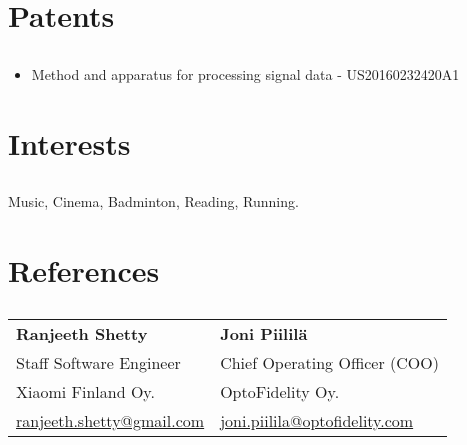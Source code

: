 \documentclass{article}
\begin{document}
\section{Patents}
\subsection{}
\begin{itemize}[label={--}]
  \itemsep0em 
  \item Method and apparatus for processing signal data - US20160232420A1
\end{itemize}

\section{Interests}
\subsection{}
Music, Cinema, Badminton, Reading, Running.
\subsection{}


\section{References}
\subsection{}
\setlength{\tabcolsep}{24pt}
\begin{tabular}{l l}
  \textbf{Ranjeeth Shetty} & \textbf{Joni Piililä} \\
  Staff Software Engineer & Chief Operating Officer (COO) \\
  Xiaomi Finland Oy. & OptoFidelity Oy. \\
  \href{mailto:me@example.com}{ranjeeth.shetty@gmail.com} & \href{mailto:me@example.com}{joni.piilila@optofidelity.com} \\
\end{tabular}
\subsection{}
\end{document}
